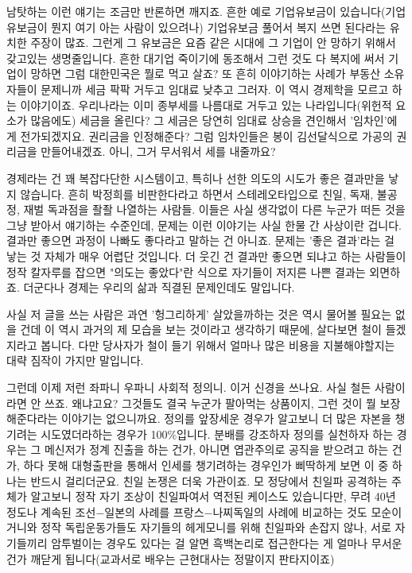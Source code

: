 남탓하는 이런 얘기는 조금만 반론하면 깨지죠.
흔한 예로 기업유보금이 있습니다(기업유보금이 뭔지 여기 아는 사람이 있으려나) 기업유보금 풀어서 복지 쓰면 된다라는 유치한 주장이 많죠.
그런게 그 유보금은 요즘 같은 시대에 그 기업이 안 망하기 위해서 갖고있는 생명줄입니다.
흔한 대기업 죽이기에 동조해서 그런 것도 다 복지에 써서 기업이 망하면 그럼 대한민국은 뭘로 먹고 살죠?
또 흔히 이야기하는 사례가 부동산 소유자들이 문제니까 세금 팍팍 거두고 임대료 낮추고 그러자.
이 역시 경제학을 모르고 하는 이야기이죠. 우리나라는 이미 종부세를 나름대로 거두고 있는 나라입니다(위헌적 요소가 많음에도)
세금을 올린다? 그 세금은 당연히 임대료 상승을 견인해서 '임차인'에게 전가되겠지요.
권리금을 인정해준다? 그럼 임차인들은 봉이 김선달식으로 가공의 권리금을 만들어내겠죠. 아니, 그거 무서워서 세를 내줄까요?
\vspace{5mm}

경제라는 건 꽤 복잡다단한 시스템이고, 특히나 선한 의도의 시도가 좋은 결과만을 낳지 않습니다.
흔히 박정희를 비판한다라고 하면서 스테레오타입으로 친일, 독재, 불공정, 재벌 독과점을 좔좔 나열하는 사람들.
이들은 사실 생각없이 다른 누군가 떠든 것을 그냥 받아서 얘기하는 수준인데, 문제는 이런 이야기는 사실 한물 간 사상이란 겁니다.
결과만 좋으면 과정이 나빠도 좋다라고 말하는 건 아니죠. 문제는 '좋은 결과'라는 걸 낳는 것 자체가 매우 어렵단 것입니다.
더 웃긴 건 결과만 좋으면 되냐고 하는 사람들이 정작 칼자루를 잡으면 "의도는 좋았다"란 식으로 자기들이 저지른 나쁜 결과는 외면하죠.
더군다나 경제는 우리의 삶과 직결된 문제인데도 말입니다.
\vspace{5mm}

사실 저 글을 쓰는 사람은 과연 '헝그리하게' 살았을까하는 것은 역시 물어볼 필요는 없을 건데
이 역시 과거의 제 모습을 보는 것이라고 생각하기 때문에, 살다보면 철이 들겠지라고 봅니다.
다만 당사자가 철이 들기 위해서 얼마나 많은 비용을 지불해야할지는 대략 짐작이 가지만 말입니다.
\vspace{5mm}

그런데 이제 저런 좌파니 우파니 사회적 정의니. 이거 신경을 쓰나요.
사실 철든 사람이라면 안 쓰죠. 왜냐고요? 그것들도 결국 누군가 팔아먹는 상품이지, 그런 것이 뭘 보장해준다라는 이야기는 없으니까요.
정의를 앞장세운 경우가 알고보니 더 많은 자본을 챙기려는 시도였더라하는 경우가 100$\%$입니다.
분배를 강조하자 정의를 실천하자 하는 경우는 그 메신저가 정계 진출을 하는 건가, 아니면 엽관주의로 공직을 받으려고 하는 건가,
하다 못해 대형출판을 통해서 인세를 챙기려하는 경우인가 삐딱하게 보면 이 중 하나는 반드시 걸리더군요.
친일 논쟁은 더욱 가관이죠. 모 정당에서 친일파 공격하는 주체가 알고보니 정작 자기 조상이 친일파여서 역전된 케이스도 있습니다만,
무려 40년 정도나 계속된 조선$-$일본의 사례를 프랑스$-$나찌독일의 사례에 비교하는 것도 모순이거니와
정작 독립운동가들도 자기들의 헤게모니를 위해 친일파와 손잡지 않나, 서로 자기들끼리 암투벌이는 경우도 있다는 걸 알면
흑백논리로 접근한다는 게 얼마나 무서운건가 깨닫게 됩니다(교과서로 배우는 근현대사는 정말이지 판타지이죠)
\vspace{5mm}

